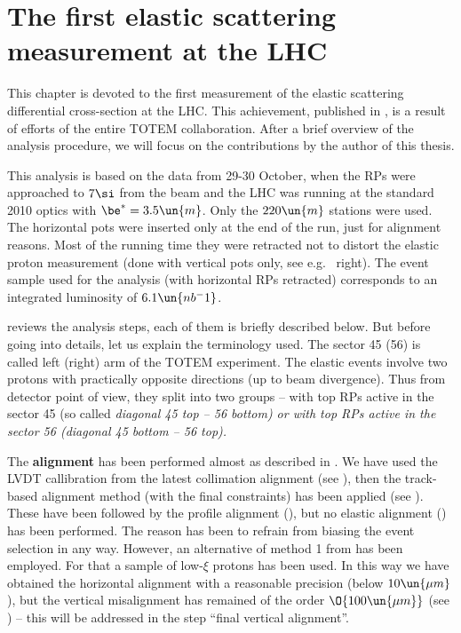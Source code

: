 \iffalse
DPE, SD, MC
\fi

\chapter[felm]{The first elastic scattering measurement at the LHC}

This chapter is devoted to the first measurement of the elastic scattering differential cross-section at the LHC. This achievement, published in , is a result of efforts of the entire TOTEM collaboration. After a brief overview of the analysis procedure, we will focus on the contributions by the author of this thesis.

This analysis is based on the data from 29-30 October, when the RPs were approached to $7\si$ from the beam and the LHC was running at the standard 2010 optics with $\be^* = 3.5\un{m}$. Only the $220\un{m}$ stations were used. The horizontal pots were inserted only at the end of the run, just for alignment reasons. Most of the running time they were retracted not to distort the elastic proton measurement (done with vertical pots only, see e.g.~ right). The event sample used for the analysis (with horizontal RPs retracted) corresponds to an integrated luminosity of $6.1\un{nb^-1}$.


 reviews the analysis steps, each of them is briefly described below. But before going into details, let us explain the terminology used. The sector 45 (56) is called left (right) arm of the TOTEM experiment. The elastic events involve two protons with practically opposite directions (up to beam divergence). Thus from detector point of view, they split into two groups -- with top RPs active in the sector 45 (so called \em{diagonal} 45 top -- 56 bottom) or with top RPs active in the sector 56 (diagonal 45 bottom -- 56 top).

\> The {\bf alignment} has been performed almost as described in . We have used the LVDT callibration from the latest collimation alignment (see ), then the track-based alignment method (with the final constraints) has been applied (see ). These have been followed by the profile alignment (), but no elastic alignment () has  been performed. The reason has been to refrain from biasing the event selection in any way. However, an alternative of method 1 from  has been employed. For that a sample of low-$\xi$ protons has been used. In this way we have obtained the horizontal alignment with a reasonable precision (below $10\un{\mu m}$), but the vertical misalignment has remained of the order $\O{100\un{\mu m}}$ (see ) -- this will be addressed in the step ``final vertical alignment''.

